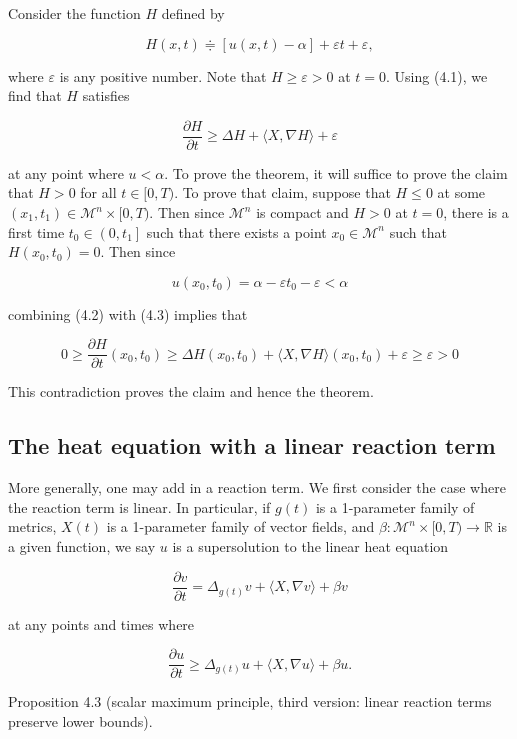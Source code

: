 \documentclass[10pt, letterpaper]{article}
\begin{document}
Consider the function $H$ defined by

$$
H(x, t) \doteqdot[u(x, t)-\alpha]+\varepsilon t+\varepsilon,
$$

where $\varepsilon$ is any positive number. Note that $H \geq \varepsilon>0$ at $t=0$. Using (4.1), we find that $H$ satisfies

$$
\frac{\partial H}{\partial t} \geq \Delta H+\langle X, \nabla H\rangle+\varepsilon
$$

at any point where $u<\alpha$. To prove the theorem, it will suffice to prove the claim that $H>0$ for all $t \in[0, T)$. To prove that claim, suppose that $H \leq 0$ at some $\left(x_1, t_1\right) \in \mathcal{M}^n \times[0, T)$. Then since $\mathcal{M}^n$ is compact and $H>0$ at $t=0$, there is a first time $t_0 \in\left(0, t_1\right]$ such that there exists a point $x_0 \in \mathcal{M}^n$ such that $H\left(x_0, t_0\right)=0$. Then since

$$
u\left(x_0, t_0\right)=\alpha-\varepsilon t_0-\varepsilon<\alpha
$$

combining (4.2) with (4.3) implies that

$$
0 \geq \frac{\partial H}{\partial t}\left(x_0, t_0\right) \geq \Delta H\left(x_0, t_0\right)+\langle X, \nabla H\rangle\left(x_0, t_0\right)+\varepsilon \geq \varepsilon>0
$$


This contradiction proves the claim and hence the theorem.



\subsection{The heat equation with a linear reaction term }

More generally, one may add in a reaction term. We first consider the case where the reaction term is linear. In particular, if $g(t)$ is a 1-parameter family of metrics, $X(t)$ is a 1-parameter family of vector fields, and $\beta: \mathcal{M}^n \times[0, T) \rightarrow \mathbb{R}$ is a given function, we say $u$ is a supersolution to the linear heat equation

$$
\frac{\partial v}{\partial t}=\Delta_{g(t)} v+\langle X, \nabla v\rangle+\beta v
$$

at any points and times where

$$
\frac{\partial u}{\partial t} \geq \Delta_{g(t)} u+\langle X, \nabla u\rangle+\beta u .
$$


Proposition 4.3 (scalar maximum principle, third version: linear reaction terms preserve lower bounds). 
\end{document}

